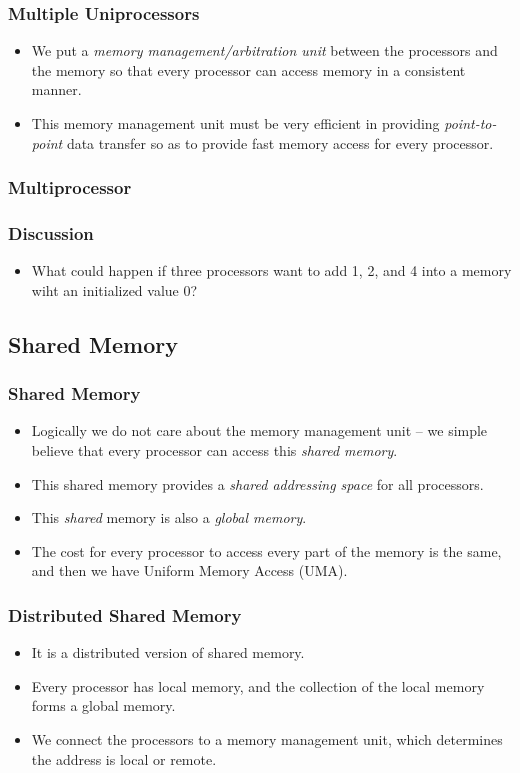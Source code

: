 \documentclass{beamer}
\begin{document}
\begin{CJK}{UTF8}{bsmi}
\begin{frame}
\frametitle{Multiple Uniprocessors}
\begin{itemize}
\item We put a {\em memory management/arbitration unit} between the
  processors and the memory so that every processor can access memory
  in a consistent manner.
\item This memory management unit must be very efficient in providing
  {\em point-to-point} data transfer so as to provide fast memory
  access for every processor.
\end{itemize}
\end{frame}

\begin{frame}
\frametitle{Multiprocessor}
\centerline{}
\end{frame}

\begin{frame}
\frametitle{Discussion}
\begin{itemize}
\item What could happen if three processors want to add 1, 2, and 4
  into a memory wiht an initialized value 0?
\end{itemize}
\end{frame}

\subsection{Shared Memory}

\begin{frame}
\frametitle{Shared Memory}
\begin{itemize}
\item Logically we do not care about the memory management unit -- we
  simple believe that every processor can access this {\em shared
    memory}.
\item This shared memory provides a {\em shared addressing space} for
  all processors.
\item This {\em shared} memory is also a {\em global memory}.
\item The cost for every processor to access every part of the memory is the same, and then we have Uniform Memory Access (UMA).
\end{itemize}
\end{frame}

\begin{frame}
\frametitle{Distributed Shared Memory}
\begin{itemize}
\item It is a distributed version of shared memory.
\item Every processor has local memory, and the collection of the local memory forms a global memory.
\item We connect the processors to a memory management unit, which
  determines the address is local or remote.
\end{itemize}
\end{frame}


\end{CJK}
\end{document}
